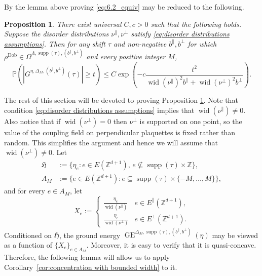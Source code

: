 \documentclass[11pt, reqno]{amsart}
\newtheorem{proposition}[theorem]{Proposition}
\newcommand{\Z}{\mathbb{Z}}
\DeclareMathOperator{\supp}{supp}
\DeclareMathOperator{\Dob}{Dob}
\DeclareMathOperator{\GE}{GE}
\renewcommand{\P}{\mathbb{P}}
\DeclareMathOperator{\wid}{wid}
\numberwithin{equation}{section}
\begin{document}
By the lemma above proving \eqref{eq:6.2_equiv} may be reduced to the following.

\begin{proposition}\label{prop:two point estimate finite volume}
There exist universal  $C,c>0$ such that the following holds. Suppose the disorder distributions $\nu^{\parallel},\nu^{\perp}$ satisfy \eqref{eq:disorder distributions assumptions}.
Then for any shift $\tau$ and non-negative $b^{\parallel},b^{\perp}$ for which $\rho^{\Dob}\in\Omega^{\Lambda,\supp(\tau),(b^{\parallel},b^{\perp})}$ and every positive integer $M$,
\begin{equation}
\label{eq:Talagrand_Delta_M}
\P \left(\left\lvert G^{\eta,\Delta_M,(b^{\parallel},b^{\perp})} (\tau)\right\rvert\geq t \right) \leq C\exp \left(-c\frac{t^{2}}{\wid(\nu^{\parallel})^2 b^{\parallel}+
\wid(\nu^{\perp})^2 b^{\perp}} \right).
\end{equation}
\end{proposition}

The rest of this section will be devoted to proving Proposition \ref{prop:two point estimate finite volume}.
Note that condition \eqref{eq:disorder distributions assumptions} implies that $\wid(\nu^{\parallel})\neq 0$. Also notice that if $\wid(\nu^{\perp})=0$ then $\nu^{\perp}$ is supported on one point, so the value of the coupling field on perpendicular plaquettes is fixed rather than random. This simplifies the argument and hence we will assume that $\wid(\nu^{\perp})\neq 0$.
Let
\begin{align*}
\mathfrak{H}&:=\{\eta_e\colon e\in E(\Z^{d+1}),\, e \nsubseteq  \supp(\tau) \times{\mathbb Z}\},\\
A_{M}&:=\{e\in E(\Z^{d+1}) \colon e \subseteq  \supp(\tau) \times \{-M,\dots,M \} \},
\end{align*}
and for every $e\in A_M$, let
\begin{equation*}
X_e:=\begin{cases}
\frac{\eta_e}{\wid(\nu^{\parallel})} & e\in E^{\parallel}(\Z^{d+1}), \\
\frac{\eta_e}{\wid(\nu^{\perp})} & e\in E^{\perp}(\Z^{d+1}).\end{cases}
\end{equation*}
Conditioned on $\mathfrak{H}$, the ground energy $\GE^{\Delta_M,\supp(\tau),(b^{\parallel},b^{\perp})}(\eta)$ may be viewed as a function of $\{ X_e \}_{e\in A_{M}}$.
Moreover, it is easy to verify that it is quasi-concave. 
Therefore, the following lemma will allow us to apply Corollary~\ref{cor:concentration with bounded width} to it.
\end{document}
